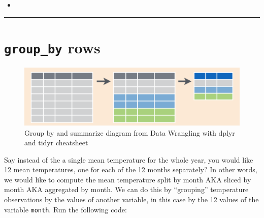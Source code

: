 \documentclass[12pt, krantz2,]{krantz}
\makeatletter
\newenvironment{Shaded}{\begin{snugshade}}{\end{snugshade}}
\newcommand{\DataTypeTok}[1]{\textcolor[rgb]{0.27,0.27,0.27}{#1}}
\newcommand{\KeywordTok}[1]{\textcolor[rgb]{0.27,0.27,0.27}{\textbf{#1}}}
\newcommand{\NormalTok}[1]{#1}
\newcommand{\OperatorTok}[1]{\textcolor[rgb]{0.43,0.43,0.43}{\textbf{#1}}}
\newcommand{\OtherTok}[1]{\textcolor[rgb]{0.37,0.37,0.37}{#1}}
\newcommand{\StringTok}[1]{\textcolor[rgb]{0.5,0.5,0.5}{#1}}
\newenvironment{kframe}{%
\medskip{}
\setlength{\fboxsep}{.8em}
 \def\at@end@of@kframe{}%
 \ifinner\ifhmode%
  \def\at@end@of@kframe{\end{minipage}}%
  \begin{minipage}{\columnwidth}%
 \fi\fi%
 \def\FrameCommand##1{\hskip\@totalleftmargin \hskip-\fboxsep
 \colorbox{shadecolor}{##1}\hskip-\fboxsep
     \hskip-\linewidth \hskip-\@totalleftmargin \hskip\columnwidth}%
 \MakeFramed {\advance\hsize-\width
   \@totalleftmargin\z@ \linewidth\hsize
   \@setminipage}}%
 {\par\unskip\endMakeFramed%
 \at@end@of@kframe}
\renewenvironment{Shaded}{\begin{kframe}}{\end{kframe}}
\newenvironment{rmdblock}[1]
  {\begin{shaded*}
  \begin{itemize}
  \renewcommand{\labelitemi}{
    \raisebox{-.7\height}[0pt][0pt]{
    }
  }
  \item
  }
  {
  \end{itemize}
  \end{shaded*}
  }
\newenvironment{learncheck}
  {\begin{rmdblock}{warning}}
  {\end{rmdblock}}
\makeatother
\begin{document}
\begin{learncheck}

\end{learncheck}

\begin{center}\rule{0.5\linewidth}{\linethickness}\end{center}

\hypertarget{groupby}{%
\section{\texorpdfstring{\texttt{group\_by} rows}{group\_by rows}}\label{groupby}}

\begin{figure}

{\centering \includegraphics[width=\textwidth]{images/group_summary} 

}

\caption{Group by and summarize diagram from Data Wrangling with dplyr and tidyr cheatsheet}\label{fig:groupsummarize}
\end{figure}

Say instead of the a single mean temperature for the whole year, you would like 12 mean temperatures, one for each of the 12 months separately? In other words, we would like to compute the mean temperature split by month AKA sliced by month AKA aggregated by month. We can do this by ``grouping'' temperature observations by the values of another variable, in this case by the 12 values of the variable \texttt{month}. Run the following code:

\begin{Shaded}
\end{Shaded}
\end{document}
